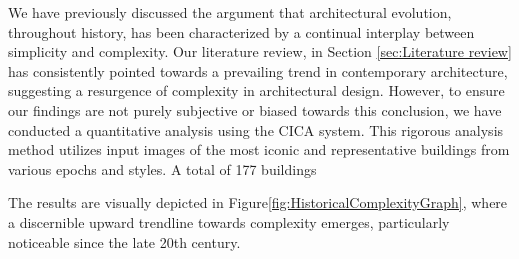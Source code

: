%    


We have previously discussed the argument that architectural evolution, throughout history, has been characterized by a continual interplay between simplicity and complexity.
Our literature review, in Section \ref{sec:Literature review} has consistently pointed towards a prevailing trend in contemporary architecture, suggesting a resurgence of complexity in architectural design.
However, to ensure our findings are not purely subjective or biased towards this conclusion, we have conducted a quantitative analysis using the CICA system.
This rigorous analysis method utilizes input images of the most iconic and representative buildings from various epochs and styles.
A total of 177 buildings

The results are visually depicted in Figure\ref{fig:HistoricalComplexityGraph}, where a discernible upward trendline towards complexity emerges, particularly noticeable since the late 20th century.











